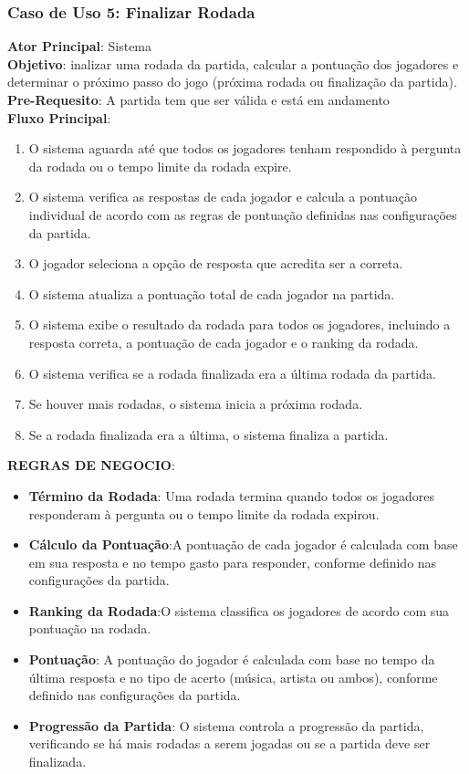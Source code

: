 \subsubsection{Caso de Uso 5: Finalizar Rodada}
    \textbf{Ator Principal}: Sistema  \\
    \textbf{Objetivo}: inalizar uma rodada da partida, calcular a pontuação dos jogadores e determinar o próximo passo do jogo (próxima rodada ou finalização da partida). \\
    \textbf{Pre-Requesito}: A partida tem que ser válida e está em andamento \\
    \textbf{Fluxo Principal}: \\
    \begin{enumerate}
        \item O sistema aguarda até que todos os jogadores tenham respondido à pergunta da rodada ou o tempo limite da rodada expire.
        \item O sistema verifica as respostas de cada jogador e calcula a pontuação individual de acordo com as regras de pontuação definidas nas configurações da partida.
        \item O jogador seleciona a opção de resposta que acredita ser a correta.
        \item O sistema atualiza a pontuação total de cada jogador na partida.
        \item O sistema exibe o resultado da rodada para todos os jogadores, incluindo a resposta correta, a pontuação de cada jogador e o ranking da rodada.
        \item O sistema verifica se a rodada finalizada era a última rodada da partida.
        \item Se houver mais rodadas, o sistema inicia a próxima rodada.
        \item Se a rodada finalizada era a última, o sistema finaliza a partida.
    \end{enumerate}
    
    \textbf{REGRAS DE NEGOCIO}:
    \begin{itemize}
        \item \textbf{Término da Rodada}: Uma rodada termina quando todos os jogadores responderam à pergunta ou o tempo limite da rodada expirou.
        \item \textbf{Cálculo da Pontuação}:A pontuação de cada jogador é calculada com base em sua resposta e no tempo gasto para responder, conforme definido nas configurações da partida.
        \item \textbf{Ranking da Rodada}:O sistema classifica os jogadores de acordo com sua pontuação na rodada.
        \item \textbf{Pontuação}: A pontuação do jogador é calculada com base no tempo da última resposta e no tipo de acerto (música, artista ou ambos), conforme definido nas configurações da partida.
        \item \textbf{Progressão da Partida}: O sistema controla a progressão da partida, verificando se há mais rodadas a serem jogadas ou se a partida deve ser finalizada.
    \end{itemize}